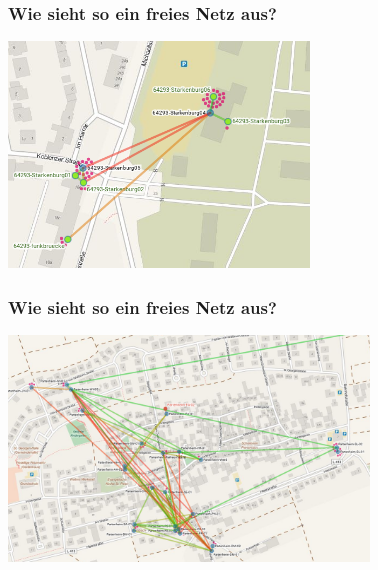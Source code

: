 \documentclass[10pt]{beamer}
\begin{document}
\begin{frame}
	\frametitle{Wie sieht so ein freies Netz aus?}
	\begin{center}
		\includegraphics[height=6cm]{images/2015-08-31_starkenburg}
	\end{center}
\end{frame}

\begin{frame}
	\frametitle{Wie sieht so ein freies Netz aus?}
	\begin{center}
		\includegraphics[height=6cm]{images/2015-10_partenheim-map}
	\end{center}
\end{frame}
\end{document}
